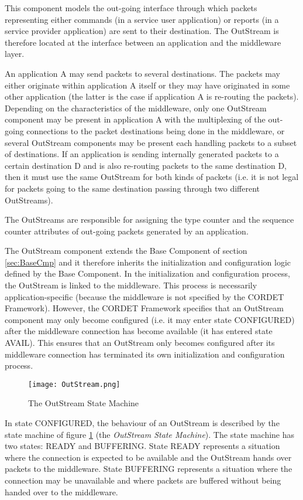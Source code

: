 This component models the out-going interface through which packets representing either commands (in a service user application) or reports (in a service provider application) are sent to their destination. The OutStream is therefore located at the interface between an application and the middleware layer. 

An application A may send packets to several destinations. The packets may either originate within application A itself or they may have originated in some other application (the latter is the case if application A is re-routing the packets). Depending on the characteristics of the middleware, only one OutStream component may be present in application A with the multiplexing of the out-going connections to the packet destinations being done in the middleware, or several OutStream components may be present each handling packets to a subset of destinations. If an application is sending internally generated packets to a certain destination D and is also re-routing packets to the same destination D, then it must use the same OutStream for both kinds of packets (i.e. it is not legal for packets going to the same destination passing through two different OutStreams).

The OutStreams are responsible for assigning the type counter and the sequence counter attributes of out-going packets generated by an application. 

The OutStream component extends the Base Component of section \ref{sec:BaseCmp} and it therefore inherits the initialization and configuration logic defined by the Base Component. In the initialization and configuration process, the OutStream is linked to the middleware. This process is necessarily application-specific (because the middleware is not specified by the CORDET Framework). However, the CORDET Framework specifies that an OutStream component may only become configured (i.e. it may enter state CONFIGURED) after the middleware connection has become available (it has entered state AVAIL). This ensures that an OutStream only becomes configured after its middleware connection has terminated its own initialization and configuration process.

\begin{figure}[ht]
 \centering
 \texttt{[image: OutStream.png]}
 \caption{The OutStream State Machine}
 \label{fig:OutStream}
\end{figure}

In state CONFIGURED, the behaviour of an OutStream is described by the state machine of figure \ref{fig:OutStream} (the \textit{OutStream State Machine}). The state machine has two states: READY and BUFFERING. State READY represents a situation where the connection is expected to be available and the OutStream hands over packets to the middleware. State BUFFERING represents a situation where the connection may be unavailable and where packets are buffered without being handed over to the middleware.

